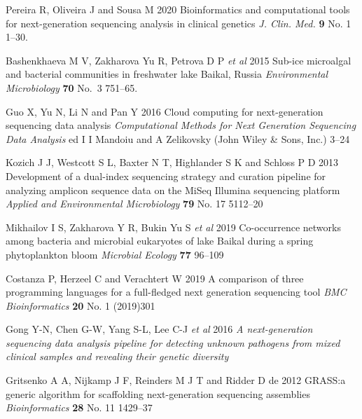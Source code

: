 \documentclass[a4paper]{jpconf}
\begin{document}
\begin{thebibliography}{0}

 Pereira R, Oliveira J and Sousa M 2020 Bioinformatics and computational tools for next-generation sequencing analysis in clinical genetics \emph{J. Clin. Med.} \textbf{9}  No. 1 1--30. 

 Bashenkhaeva M V, Zakharova Yu R, Petrova D P \emph{et al} 2015 Sub-ice microalgal and bacterial communities in freshwater lake Baikal, Russia \emph{Environmental Microbiology} \textbf{70} No.~3 751--65. 

 Guo X, Yu N, Li N and Pan Y 2016 Cloud computing for next-generation sequencing data analysis \emph{Computational Methods for Next Generation Sequencing Data Analysis} ed I I Mandoiu and  A Zelikovsky (John Wiley \& Sons, Inc.) 3--24

 Kozich J J, Westcott S L, Baxter N T, Highlander S K and Schloss P D 2013 Development of a dual-index sequencing strategy and curation pipeline for analyzing amplicon sequence data on the MiSeq Illumina sequencing platform \emph{Applied and Environmental Microbiology} \textbf{79} No. 17 5112--20 

 Mikhailov I S, Zakharova Y R, Bukin Yu S \emph{et al} 2019 Co-occurrence networks among bacteria and microbial eukaryotes of lake Baikal during a spring phytoplankton bloom \emph{Microbial Ecology} \textbf{77} 96--109  %


 Costanza P, Herzeel C and Verachtert W 2019 A comparison of three
 programming languages for a full-fledged next generation sequencing tool \emph{BMC Bioinformatics} \textbf{20} No. 1 (2019)301 

 Gong Y-N, Chen G-W, Yang S-L, Lee C-J \emph{et al} 2016 \emph{A next-generation sequencing data analysis pipeline for detecting unknown pathogens from mixed clinical samples and revealing their genetic diversity} 

 Gritsenko A A, Nijkamp J F, Reinders M J T and Ridder D de 2012 GRASS:\@ a generic algorithm for scaffolding next-generation sequencing assemblies \emph{Bioinformatics} \textbf{28} No. 11  1429--37 


\end{thebibliography}
\end{document}
